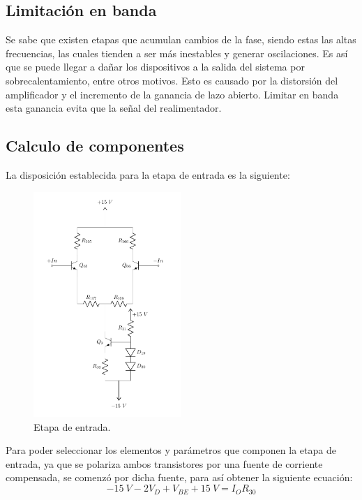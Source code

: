 \subsection{Limitación en banda}
Se sabe que  existen etapas que acumulan cambios de la fase, siendo estas las altas frecuencias, las cuales tienden a ser más inestables y generar oscilaciones. Es así que se puede llegar a dañar los dispositivos a la salida del sistema por sobrecalentamiento, entre otros motivos. Esto es causado por la distorsión del amplificador y el incremento de la ganancia de lazo abierto. Limitar en banda esta ganancia evita que la señal del realimentador.

\subsection{Calculo de componentes}
La disposición establecida para la etapa de entrada es la siguiente:
\begin{figure}[H]
\centering
	\includegraphics[width=0.5\textwidth, page=1]{ImagenesInput-Stage/Input.pdf}
	\caption{Etapa de entrada.}
	\label{fig:input}
\end{figure}

Para poder seleccionar los elementos y parámetros que componen la etapa de entrada, ya que se polariza ambos transistores por una fuente de corriente compensada, se comenzó por dicha fuente, para así obtener la siguiente ecuación:
\begin{equation}
	-15 \ V - 2V_{D} + V_{BE} + 15 \ V = I_O R_{30} 
\end{equation}

